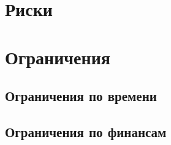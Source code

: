 \documentclass[a4paper,12pt]{article}
\begin{document}
\section{Риски}
\section{Ограничения}
\subsection{Ограничения по времени}
\subsection{Ограничения по финансам}
\end{document}
